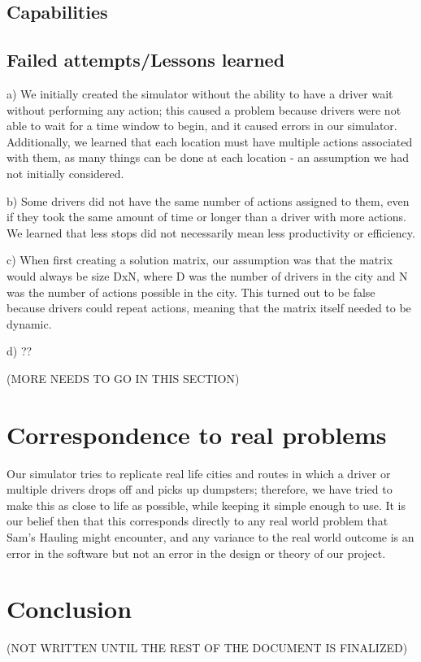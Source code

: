 \documentclass{article}
\begin{document}
\subsection{Capabilities}
\subsection{Failed attempts/Lessons learned}

a) We initially created the simulator without the ability to have a driver wait without performing any action; this caused a problem because drivers were not able to wait for a time window to begin, and it caused errors in our simulator.  Additionally, we learned that each location must have multiple actions associated with them, as many things can be done at each location - an assumption we had not initially considered.

b) Some drivers did not have the same number of actions assigned to them, even if they took the same amount of time or longer than a driver with more actions.  We learned that less stops did not necessarily mean less productivity or efficiency.

c) When first creating a solution matrix, our assumption was that the matrix would always be size DxN, where D was the number of drivers in the city and N was the number of actions possible in the city.  This turned out to be false because drivers could repeat actions, meaning that the matrix itself needed to be dynamic.

d) ??

(MORE NEEDS TO GO IN THIS SECTION)

\section{Correspondence to real problems}

Our simulator tries to replicate real life cities and routes in which a driver or multiple drivers drops off and picks up dumpsters; therefore, we have tried to make this as close to life as possible, while keeping it simple enough to use.  It is our belief then that this corresponds directly to any real world problem that Sam's Hauling might encounter, and any variance to the real world outcome is an error in the software but not an error in the design or theory of our project.


\section{Conclusion}

(NOT WRITTEN UNTIL THE REST OF THE DOCUMENT IS FINALIZED)
\end{document}
